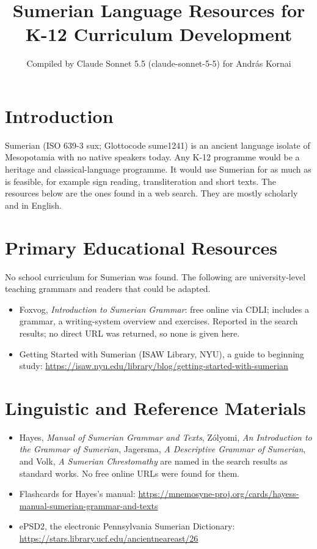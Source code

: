 \documentclass[12pt]{article}
\title{Sumerian Language Resources for K-12 Curriculum Development}
\author{Compiled by Claude Sonnet 5.5 (claude-sonnet-5-5) for Andr\'as Kornai}
\date{}
\begin{document}
\maketitle

\section{Introduction}
Sumerian (ISO 639-3 sux; Glottocode sume1241) is an ancient language isolate of Mesopotamia with no native speakers today. Any K-12 programme would be a heritage and classical-language programme. It would use Sumerian for as much as is feasible, for example sign reading, transliteration and short texts. The resources below are the ones found in a web search. They are mostly scholarly and in English.

\section{Primary Educational Resources}
No school curriculum for Sumerian was found. The following are university-level teaching grammars and readers that could be adapted.
\begin{itemize}
\item Foxvog, \emph{Introduction to Sumerian Grammar}: free online via CDLI; includes a grammar, a writing-system overview and exercises. Reported in the search results; no direct URL was returned, so none is given here.
\item Getting Started with Sumerian (ISAW Library, NYU), a guide to beginning study: \url{https://isaw.nyu.edu/library/blog/getting-started-with-sumerian}
\end{itemize}

\section{Linguistic and Reference Materials}
\begin{itemize}
\item Hayes, \emph{Manual of Sumerian Grammar and Texts}, Zólyomi, \emph{An Introduction to the Grammar of Sumerian}, Jagersma, \emph{A Descriptive Grammar of Sumerian}, and Volk, \emph{A Sumerian Chrestomathy} are named in the search results as standard works. No free online URLs were found for them.
\item Flashcards for Hayes's manual: \url{https://mnemosyne-proj.org/cards/hayess-manual-sumerian-grammar-and-texts}
\item ePSD2, the electronic Pennsylvania Sumerian Dictionary: \url{https://stars.library.ucf.edu/ancientneareast/26}
\end{itemize}
\end{document}
